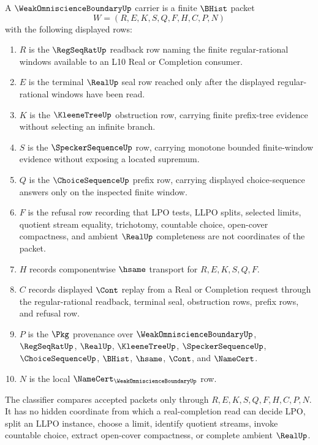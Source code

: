 \begin{definition}
\label{def:weak-omniscience-boundary-carrier}
A $\WeakOmniscienceBoundaryUp$ carrier is a finite $\BHist$ packet
$$
W=(R,E,K,S,Q,F,H,C,P,N)
$$
with the following displayed rows:
\begin{enumerate}
\item $R$ is the $\RegSeqRatUp$ readback row naming the finite regular-rational windows available to an L10 Real or Completion consumer.
\item $E$ is the terminal $\RealUp$ seal row reached only after the displayed regular-rational windows have been read.
\item $K$ is the $\KleeneTreeUp$ obstruction row, carrying finite prefix-tree evidence without selecting an infinite branch.
\item $S$ is the $\SpeckerSequenceUp$ row, carrying monotone bounded finite-window evidence without exposing a located supremum.
\item $Q$ is the $\ChoiceSequenceUp$ prefix row, carrying displayed choice-sequence answers only on the inspected finite window.
\item $F$ is the refusal row recording that LPO tests, LLPO splits, selected limits, quotient stream equality, trichotomy, countable choice, open-cover compactness, and ambient $\RealUp$ completeness are not coordinates of the packet.
\item $H$ records componentwise $\hsame$ transport for $R,E,K,S,Q,F$.
\item $C$ records displayed $\Cont$ replay from a Real or Completion request through the regular-rational readback, terminal seal, obstruction rows, prefix rows, and refusal row.
\item $P$ is the $\Pkg$ provenance over $\WeakOmniscienceBoundaryUp$, $\RegSeqRatUp$, $\RealUp$, $\KleeneTreeUp$, $\SpeckerSequenceUp$, $\ChoiceSequenceUp$, $\BHist$, $\hsame$, $\Cont$, and $\NameCert$.
\item $N$ is the local $\NameCert_{\WeakOmniscienceBoundaryUp}$ row.
\end{enumerate}
The classifier compares accepted packets only through $R,E,K,S,Q,F,H,C,P,N$. It has no hidden coordinate from which a real-completion read can decide LPO, split an LLPO instance, choose a limit, identify quotient streams, invoke countable choice, extract open-cover compactness, or complete ambient $\RealUp$.
\end{definition}

